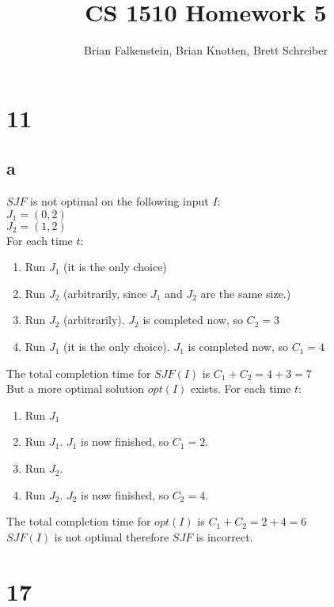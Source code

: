 \documentclass[letterpaper,notitlepage,twoside]{article}
\title{CS 1510 Homework 5}
\author{Brian Falkenstein, Brian Knotten, Brett Schreiber}
\begin{document}
\maketitle

\section*{11}
\subsection*{a}
$SJF$ is not optimal on the following input $I$:\\
$J_1 = (0, 2)$\\
$J_2 = (1, 2)$\\
For each time $t$:
\begin{enumerate}
\item Run $J_1$ (it is the only choice)
\item Run $J_2$ (arbitrarily, since $J_1$ and $J_2$ are the same size.)
\item Run $J_2$ (arbitrarily). $J_2$ is completed now, so $C_2 = 3$
\item Run $J_1$ (it is the only choice). $J_1$ is completed now, so $C_1 = 4$
\end{enumerate}
The total completion time for $SJF(I)$ is $C_1 + C_2 = 4 + 3 = 7$\\
But a more optimal solution $opt(I)$ exists. For each time $t$:
\begin{enumerate}
\item Run $J_1$
\item Run $J_1$. $J_1$ is now finished, so $C_1 = 2$.
\item Run $J_2$.
\item Run $J_2$. $J_2$ is now finished, so $C_2 = 4$.
\end{enumerate}
The total completion time for $opt(I)$ is $C_1 + C_2 = 2 + 4 = 6$\\
$SJF(I)$ is not optimal therefore $SJF$ is incorrect.
\section*{17}
\end{document}
